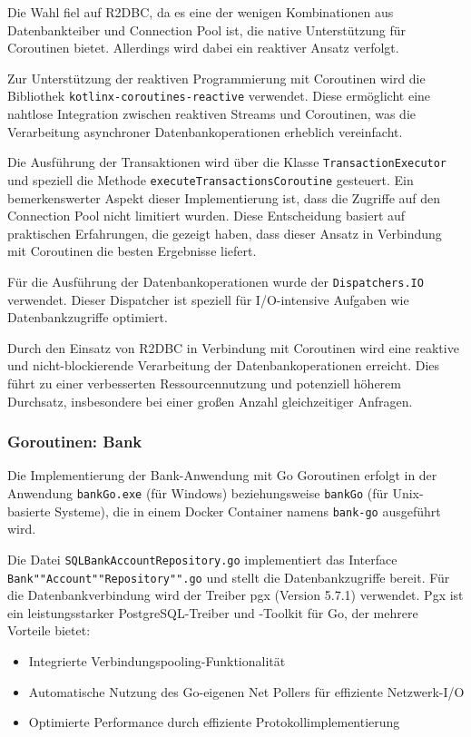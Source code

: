 \documentclass[fontsize=12pt,paper=a4,twoside=semi,parskip=half-,headsepline,headinclude]{scrreprt}
\begin{document}
Die Wahl fiel auf R2DBC, da es eine der wenigen Kombinationen aus Datenbankteiber und Connection Pool ist, die native Unterstützung für Coroutinen bietet. Allerdings wird dabei ein reaktiver Ansatz verfolgt.

Zur Unterstützung der reaktiven Programmierung mit Coroutinen wird die Bibliothek \texttt{kotlinx-coroutines-reactive} verwendet. Diese ermöglicht eine nahtlose Integration zwischen reaktiven Streams und Coroutinen, was die Verarbeitung asynchroner Datenbankoperationen erheblich vereinfacht.

Die Ausführung der Transaktionen wird über die Klasse \texttt{TransactionExecutor} und speziell die Methode \texttt{executeTransactionsCoroutine} gesteuert. Ein bemerkenswerter Aspekt dieser Implementierung ist, dass die Zugriffe auf den Connection Pool nicht limitiert wurden. Diese Entscheidung basiert auf praktischen Erfahrungen, die gezeigt haben, dass dieser Ansatz in Verbindung mit Coroutinen die besten Ergebnisse liefert.

Für die Ausführung der Datenbankoperationen wurde der \texttt{Dispatchers.IO} verwendet. Dieser Dispatcher ist speziell für I/O-intensive Aufgaben wie Datenbankzugriffe optimiert.

Durch den Einsatz von R2DBC in Verbindung mit Coroutinen wird eine reaktive und nicht-blockierende Verarbeitung der Datenbankoperationen erreicht. Dies führt zu einer verbesserten Ressourcennutzung und potenziell höherem Durchsatz, insbesondere bei einer großen Anzahl gleichzeitiger Anfragen.

\subsubsection{Goroutinen: Bank}

Die Implementierung der Bank-Anwendung mit Go Goroutinen erfolgt in der Anwendung \texttt{bankGo.exe} (für Windows) beziehungsweise \texttt{bankGo} (für Unix-basierte Systeme), die in einem Docker Container namens \texttt{bank-go} ausgeführt wird.

Die Datei \texttt{SQLBankAccountRepository.go} implementiert das Interface \texttt{Bank""Account""Repository"".go} und stellt die Datenbankzugriffe bereit. Für die Datenbankverbindung wird der Treiber pgx (Version 5.7.1) verwendet. Pgx ist ein leistungsstarker Postgre\-SQL-Treiber und -Toolkit für Go, der mehrere Vorteile bietet:

\begin{itemize}
	\item Integrierte Verbindungspooling-Funktionalität
	\item Automatische Nutzung des Go-eigenen Net Pollers für effiziente Netzwerk-I/O
	\item Optimierte Performance durch effiziente Protokollimplementierung
\end{itemize}
\end{document}
